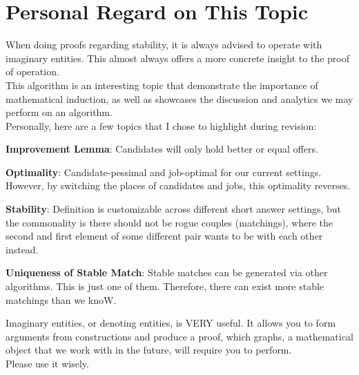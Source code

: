 \section{Personal Regard on This Topic}
When doing proofs regarding stability, it is always advised to operate with imaginary entities. This almost always offers a more concrete insight to the proof of operation. \\
This algorithm is an interesting topic that demonstrate the importance of mathematical induction, as well as showcases the discussion and analytics we may perform on an algorithm. \\
Personally, here are a few topics that I chose to highlight during revision:
\begin{bindenum}
    \item \textbf{Improvement Lemma}: Candidates will only hold better or equal offers.
    \item \textbf{Optimality}: Candidate-pessimal and job-optimal for our current settings. However, by switching the places of candidates and jobs, this optimality reverses.
    \item \textbf{Stability}: Definition is customizable across different short answer settings, but the commonality is there should not be rogue couples (matchings), where the second and first element of some different pair wants to be with each other instead.
    \item \textbf{Uniqueness of Stable Match}: Stable matches can be generated via other algorithms. This is just one of them. Therefore, there can exist more stable matchings than we knoW.
\end{bindenum}
Imaginary entities, or denoting entities, is VERY useful. It allows you to form arguments from constructions and produce a proof, which graphs, a mathematical object that we work with in the future, will require you to perform. \\
Please use it wisely.
